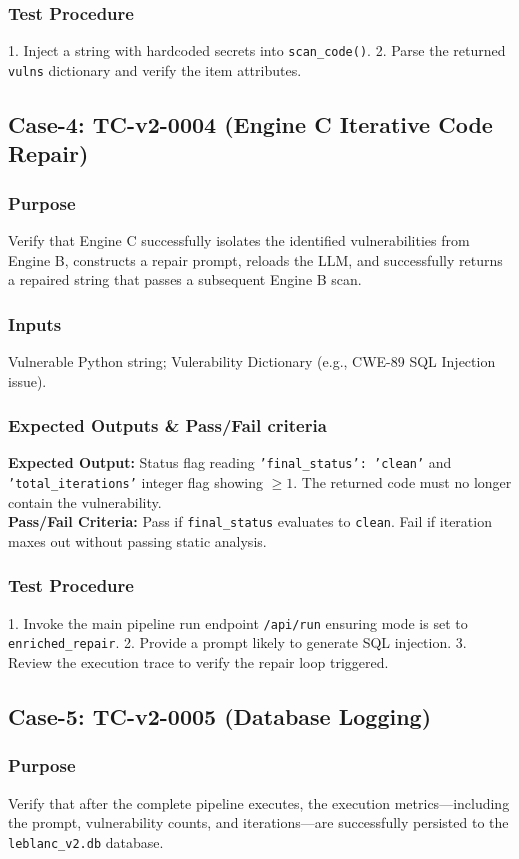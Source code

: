 \documentclass[12pt, a4paper]{article}
\begin{document}
\subsubsection{Test Procedure}
1. Inject a string with hardcoded secrets into \texttt{scan\_code()}. 2. Parse the returned \texttt{vulns} dictionary and verify the item attributes.

\subsection{Case-4: TC-v2-0004 (Engine C Iterative Code Repair)}
\subsubsection{Purpose}
Verify that Engine C successfully isolates the identified vulnerabilities from Engine B, constructs a repair prompt, reloads the LLM, and successfully returns a repaired string that passes a subsequent Engine B scan.
\subsubsection{Inputs}
Vulnerable Python string; Vulerability Dictionary (e.g., CWE-89 SQL Injection issue).
\subsubsection{Expected Outputs \& Pass/Fail criteria}
\textbf{Expected Output:} Status flag reading \texttt{'final\_status': 'clean'} and \texttt{'total\_iterations'} integer flag showing $\ge 1$. The returned code must no longer contain the vulnerability. \\
\textbf{Pass/Fail Criteria:} Pass if \texttt{final\_status} evaluates to \texttt{clean}. Fail if iteration maxes out without passing static analysis.
\subsubsection{Test Procedure}
1. Invoke the main pipeline run endpoint \texttt{/api/run} ensuring mode is set to \texttt{enriched\_repair}. 2. Provide a prompt likely to generate SQL injection. 3. Review the execution trace to verify the repair loop triggered.

\subsection{Case-5: TC-v2-0005 (Database Logging)}
\subsubsection{Purpose}
Verify that after the complete pipeline executes, the execution metrics—including the prompt, vulnerability counts, and iterations—are successfully persisted to the \texttt{leblanc\_v2.db} database.
\end{document}
